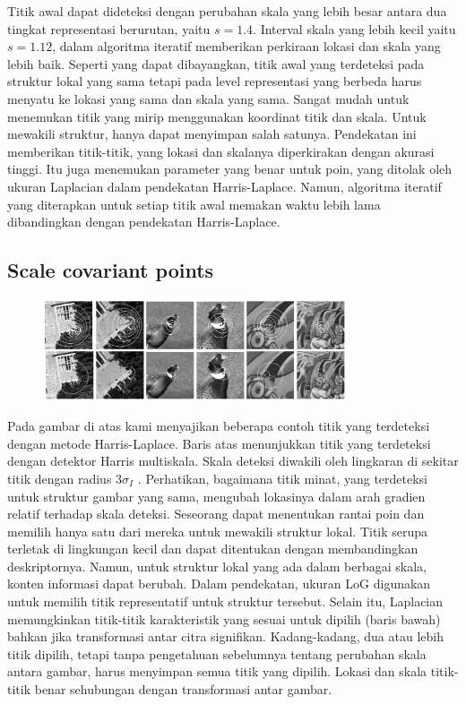 Titik awal dapat dideteksi dengan perubahan skala yang lebih besar antara dua tingkat representasi berurutan, yaitu \(s = 1.4\). Interval skala yang lebih kecil yaitu \(s = 1.12\), dalam algoritma iteratif memberikan perkiraan lokasi dan skala yang lebih baik. Seperti yang dapat dibayangkan, titik awal yang terdeteksi pada struktur lokal yang sama tetapi pada level representasi yang berbeda harus menyatu ke lokasi yang sama dan skala yang sama. Sangat mudah untuk menemukan titik yang mirip menggunakan koordinat titik dan skala. Untuk mewakili struktur, hanya dapat menyimpan salah satunya. Pendekatan ini memberikan titik-titik, yang lokasi dan skalanya diperkirakan dengan akurasi tinggi. Itu juga menemukan parameter yang benar untuk poin, yang ditolak oleh ukuran Laplacian dalam pendekatan Harris-Laplace. Namun, algoritma iteratif yang diterapkan untuk setiap titik awal memakan waktu lebih lama dibandingkan dengan pendekatan Harris-Laplace.

\subsection{\textbf{Scale covariant points}}
\begin{figure}
  \centering{}
  \includegraphics[width=0.8\textwidth]{gambar/Scale invariant interest point detection.jpg}
  \caption{}
\end{figure}

Pada gambar di atas kami menyajikan beberapa contoh titik yang terdeteksi dengan metode Harris-Laplace. Baris atas menunjukkan titik yang terdeteksi dengan detektor Harris multiskala. Skala deteksi diwakili oleh lingkaran di sekitar titik dengan radius \(3\sigma_{I}\) . Perhatikan, bagaimana titik minat, yang terdeteksi untuk struktur gambar yang sama, mengubah lokasinya dalam arah gradien relatif terhadap skala deteksi. Seseorang dapat menentukan rantai poin dan memilih hanya satu dari mereka untuk mewakili struktur lokal. Titik serupa terletak di lingkungan kecil dan dapat ditentukan dengan membandingkan deskriptornya. Namun, untuk struktur lokal yang ada dalam berbagai skala, konten informasi dapat berubah. Dalam pendekatan, ukuran LoG digunakan untuk memilih titik representatif untuk struktur tersebut. Selain itu, Laplacian memungkinkan titik-titik karakteristik yang sesuai untuk dipilih (baris bawah) bahkan jika transformasi antar citra signifikan. Kadang-kadang, dua atau lebih titik dipilih, tetapi tanpa pengetahuan sebelumnya tentang perubahan skala antara gambar, harus menyimpan semua titik yang dipilih. Lokasi dan skala titik-titik benar sehubungan dengan transformasi antar gambar.

